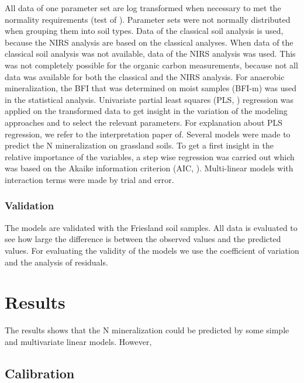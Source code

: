 \documentclass[10pt,twoside,dutch,english]{report}
\begin{document}
All data of one parameter set are log transformed when necessary to met the normality requirements (test of \citet{Shapiro1965}). Parameter sets were not normally distributed when grouping them into soil types. Data of the classical soil analysis is used, because the NIRS analysis are based on the classical analyses. When data of the classical soil analysis was not available, data of the NIRS analysis was used. This was not completely possible for the organic carbon measurements, because not all data was available for both the classical and the NIRS analysis. For anaerobic mineralization, the BFI that was determined on moist samples (BFI-m) was used in the statistical analysis. 
Univariate partial least squares (PLS, \citep{Mevik2013}) regression was applied on the transformed data to get insight in the variation of the modeling approaches and to select the relevant parameters. For explanation about PLS regression, we refer to the interpretation paper of\citet{Garthwaite1994}. 
Several models were made to predict the N mineralization on grassland soils. To get a first insight in the relative importance of the variables, a step wise regression was carried out which was based on the Akaike information criterion (AIC, \citep{Sakamoto1986}). Multi-linear models with interaction terms were made by trial and error. 

\subsection{Validation}
The models are validated with the Friesland soil samples. All data is evaluated to see how large the difference is between the observed values and the predicted values. For evaluating the validity of the models we use the coefficient of variation and the analysis of residuals. 







\chapter{Results}

The results shows that the N mineralization could be predicted by some simple and multivariate linear models. However, 
\section{Calibration}
\end{document}
